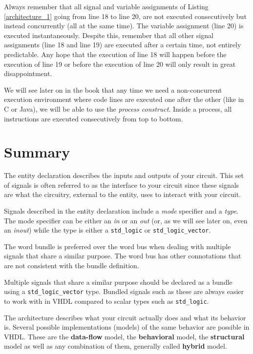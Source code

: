 Always remember that all signal and variable assignments of Listing \ref{architecture_1} going from line 18 to line 20, are not executed consecutively but instead concurrently (all at the same time). The variable assignment (line 20) is executed instantaneously. Despite this, remember that all other signal assignments (line 18 and line 19) are executed after a certain time, not entirely predictable. Any hope that the execution of line 18 will happen before the execution of line 19 or before the execution of line 20 will only result in great disappointment. 

We will see later on in the book that any time we need a non-concurrent execution environment where code lines are executed one after the other (like in C or Java), we will be able to use the \textit{process construct}. Inside a process, all instructions are executed consecutively from top to bottom.

\section{Summary}
\begin{my_list}
\item The entity declaration describes the inputs and outputs of your circuit. This set of signals is often referred to as the interface to your circuit since these signals are what the circuitry, external to the entity, uses to interact with your circuit.
\item Signals described in the entity declaration include a \textit{mode} specifier and a \textit{type}. The mode specifier can be either an \textit{in} or an \textit{out} (or, as we will see later on, even an \textit{inout}) while the type is either a \texttt{std\_logic} or \texttt{std\_logic\_vector}.
\item The word bundle is preferred over the word bus when dealing with multiple signals that share a similar purpose. The word bus has other connotations that are not consistent with the bundle definition.
\item Multiple signals that share a similar purpose should be declared as a bundle using a \texttt{std\_logic\_vector} type. Bundled signals such as these are always easier to work with in VHDL compared to scalar types such as \texttt{std\_logic}.
\item The architecture describes what your circuit actually does and what its behavior is. Several possible implementations (models) of the same behavior are possible in VHDL. These are the \textbf{data-flow} model, the \textbf{behavioral} model, the \textbf{structural} model as well as any combination of them, generally called \textbf{hybrid} model.
\end{my_list}

